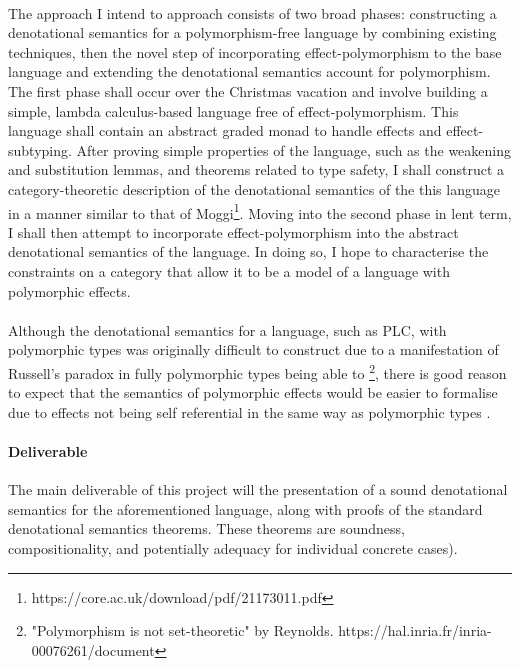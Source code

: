 \documentclass[11pt]{article}
\begin{document}
\paragraph{}{
The approach I intend to approach consists of two broad phases: constructing a denotational semantics for a polymorphism-free language by combining existing techniques, then the novel step of incorporating effect-polymorphism to the base language and extending the denotational semantics account for polymorphism. The first phase shall occur over the Christmas vacation and involve building a simple, lambda calculus-based language free of effect-polymorphism. This language shall contain an abstract graded monad to handle effects and effect-subtyping. After proving simple properties of the language, such as the weakening and substitution lemmas, and theorems related to type safety, I shall construct a category-theoretic description of the denotational semantics of the this language in a manner similar to that of Moggi\footnote{https://core.ac.uk/download/pdf/21173011.pdf}. Moving into the second phase in lent term, I shall then attempt to incorporate effect-polymorphism into the abstract denotational semantics of the language. In doing so, I hope to characterise the constraints on a category that allow it to be a model of a language with polymorphic effects.
}

\paragraph{}{
Although the denotational semantics for a language, such as PLC, with polymorphic types was originally difficult to construct due to a manifestation of Russell's paradox in fully polymorphic types being able to \footnote{"Polymorphism
is not set-theoretic" by Reynolds. https://hal.inria.fr/inria-00076261/document}, there is good reason to expect that the semantics of polymorphic effects would be easier to formalise due to effects not being self referential in the same way as polymorphic types .
}




\paragraph{Deliverable}{
The main deliverable of this project will the presentation of a sound denotational semantics for the aforementioned language, along with proofs of the standard denotational semantics theorems. These theorems are soundness, compositionality, and potentially adequacy for individual concrete cases).
}
\end{document}
